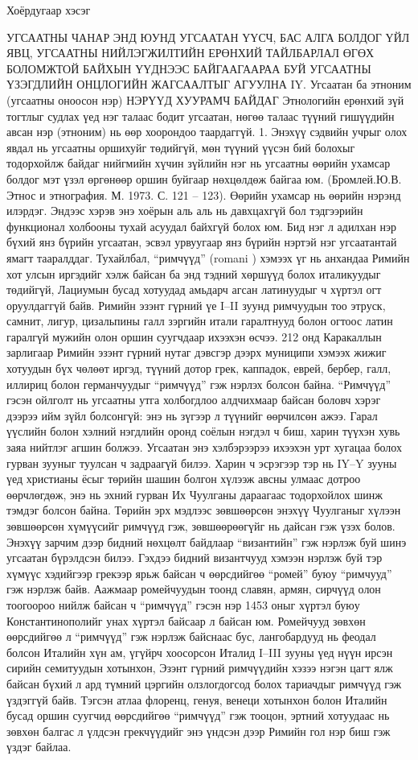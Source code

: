 Хоёрдугаар хэсэг

УГСААТНЫ ЧАНАР
ЭНД ЮУНД УГСААТАН ҮҮСЧ, БАС АЛГА БОЛДОГ ҮЙЛ ЯВЦ, УГСААТНЫ НИЙЛЭГЖИЛТИЙН ЕРӨНХИЙ ТАЙЛБАРЛАЛ ӨГӨХ БОЛОМЖТОЙ БАЙХЫН ҮҮДНЭЭС БАЙГААГААРАА БУЙ УГСААТНЫ ҮЗЭГДЛИЙН ОНЦЛОГИЙН ЖАГСААЛТЫГ АГУУЛНА
IY. Угсаатан ба этноним (угсаатны оноосон нэр)
НЭРҮҮД ХУУРАМЧ БАЙДАГ
Этнологийн ерөнхий зүй тогтлыг судлах үед нэг талаас бодит угсаатан, нөгөө талаас түүний гишүүдийн авсан нэр (этноним) нь өөр хоорондоо таардаггүй.
1. Энэхүү сэдвийн учрыг олох явдал нь угсаатны оршихуйг төдийгүй, мөн түүний үүсэн бий болохыг тодорхойлж байдаг нийгмийн хүчин зүйлийн нэг нь угсаатны өөрийн ухамсар болдог мэт үзэл өргөнөөр оршин буйгаар нөхцөлдөж байгаа юм. (Бромлей.Ю.В. Этнос и этнография. М. 1973. С. 121 – 123). Өөрийн ухамсар нь өөрийн нэрэнд илэрдэг. Эндээс хэрэв энэ хоёрын аль аль нь давхцахгүй бол тэдгээрийн функционал холбооны тухай асуудал байхгүй болох юм.
Бид нэг л адилхан нэр бүхий янз бүрийн угсаатан, эсвэл урвуугаар янз бүрийн нэртэй нэг угсаатантай ямагт тааралддаг. Тухайлбал, “римчүүд” (romani ) хэмээх үг нь анхандаа Римийн хот улсын иргэдийг хэлж байсан ба энд тэдний хөршүүд болох италикуудыг төдийгүй, Лациумын бусад хотуудад амьдарч агсан латинуудыг ч хүртэл огт оруулдаггүй байв. Римийн эзэнт гүрний үе I–II зуунд римчуудын тоо этруск, самнит, лигур, цизальпины галл зэргийн итали гаралтнууд болон огтоос латин гаралгүй мужийн олон оршин суугчдаар ихээхэн өсчээ. 212 онд Каракаллын зарлигаар Римийн эзэнт гүрний нутаг дэвсгэр дээрх муниципи хэмээх жижиг хотуудын бүх чөлөөт иргэд, түүний дотор грек, каппадок, еврей, бербер, галл, иллириц болон германчуудыг “римчүүд” гэж нэрлэх болсон байна. “Римчүүд” гэсэн ойлголт нь угсаатны утга холбогдлоо алдчихмаар байсан боловч хэрэг дээрээ ийм зүйл болсонгүй: энэ нь зүгээр л түүнийг өөрчилсөн ажээ. Гарал үүслийн болон хэлний нэгдлийн оронд соёлын нэгдэл ч биш, харин түүхэн хувь заяа нийтлэг агшин болжээ. Угсаатан энэ хэлбэрээрээ ихээхэн урт хугацаа болох гурван зууныг туулсан ч задраагүй билээ. Харин ч эсрэгээр тэр нь IY–Y зууны үед христианы ёсыг төрийн шашин болгон хүлээж авсны улмаас дотроо өөрчлөгдөж, энэ нь эхний гурван Их Чуулганы дараагаас тодорхойлох шинж тэмдэг болсон байна. Төрийн эрх мэдлээс зөвшөөрсөн энэхүү Чуулганыг хүлээн зөвшөөрсөн хүмүүсийг римчүүд гэж, зөвшөөрөөгүйг нь дайсан гэж үзэх болов. Энэхүү зарчим дээр бидний нөхцөлт байдлаар “византийн” гэж нэрлэж буй шинэ угсаатан бүрэлдсэн билээ. Гэхдээ бидний византчууд хэмээн нэрлэж буй тэр хүмүүс хэдийгээр грекээр ярьж байсан ч өөрсдийгөө “ромей” буюу “римчууд” гэж нэрлэж байв. Аажмаар ромейчуудын тоонд славян, армян, сирчүүд олон тоогоороо нийлж байсан ч “римчүүд” гэсэн нэр 1453 оныг хүртэл буюу Константинополийг унах хүртэл байсаар л байсан юм. Ромейчууд зөвхөн өөрсдийгөө л “римчүүд” гэж нэрлэж байснаас бус, лангобардууд нь феодал болсон Италийн хүн ам, үгүйрч хоосорсон Италид I–III зууны үед нүүн ирсэн сирийн семитуудын хотынхон, Эзэнт гүрний римчүүдийн хэзээ нэгэн цагт ялж байсан бүхий л ард түмний цэргийн олзлогдогсод болох тариачдыг римчүүд гэж үздэггүй байв. Тэгсэн атлаа флоренц, генуя, венеци хотынхон болон Италийн бусад оршин суугчид өөрсдийгөө “римчүүд” гэж тооцон, эртний хотуудаас нь зөвхөн балгас л үлдсэн грекчүүдийг энэ үндсэн дээр Римийн гол нэр биш гэж үздэг байлаа.
